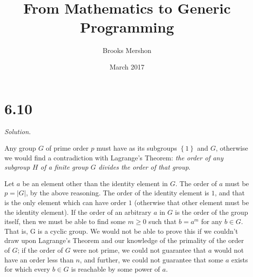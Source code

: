 \documentclass{article}
\title{From Mathematics to Generic Programming}
\author{Brooks Mershon}
\date{March 2017}
\begin{document}
\maketitle

\section*{6.10}

\textit{Solution.}

Any group $G$ of prime order $p$ must have as its subgroups $\left\{ 1 \right\}$ and $G$, otherwise we would find a contradiction with Lagrange's Theorem: \textit{the order of any subgroup $H$ of a finite group $G$ divides the order of that group}.

Let $a$ be an element other than the identity element in $G$. The order of $a$ must be $p = \lvert G \rvert$, by the above reasoning. The order of the identity element is $1$, and that is the only element which can have order $1$ (otherwise that other element must be the identity element). If the order of an arbitrary $a$ in $G$ is the order of the group itself, then we must be able to find some $m \geq 0$ such that $b = a^m$ for any $b \in G$. That is, G is a cyclic group. We would not be able to prove this if we couldn't draw upon Lagrange's Theorem and our knowledge of the primality of the order of $G$; if the order of $G$ were not prime, we could not guarantee that $a$ would not have an order less than $n$, and further, we could not guarantee that some $a$ exists for which every $b \in G$ is reachable by some power of $a$.
\end{document}
